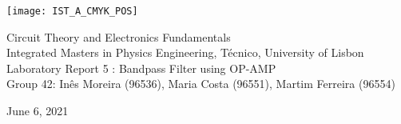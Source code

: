 
\thispagestyle {empty}

\texttt{[image: IST\_A\_CMYK\_POS]}

\begin{center}
%
\vspace{1.0cm}

\vspace{1cm}
{\FontLb Circuit Theory and Electronics Fundamentals} \\ %
\vspace{1cm}
{\FontSn Integrated Masters in Physics Engineering, Técnico, University of Lisbon} \\ %
\vspace{1cm}
{\FontSn Laboratory Report 5 : Bandpass Filter using OP-AMP} \\
\vspace{1cm}
{\FontSn Group 42: Inês Moreira (96536), Maria Costa (96551), Martim Ferreira (96554)}
\vspace{1cm}
\par
{\FontSn June 6, 2021} \\ %
\vspace{1cm}
%
\end{center}

